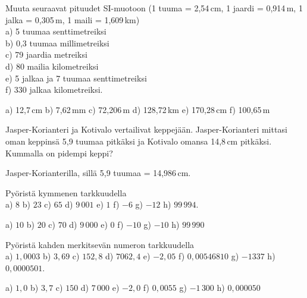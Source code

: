 \begin{tehtavasivu}
\begin{tehtava}
Muuta seuraavat pituudet SI-muotoon (1 tuuma = 2,54\,cm, 1 jaardi = 0,914\,m, 1 jalka = 0,305\,m, 1 maili = 1,609\,km) \\
a) 5 tuumaa senttimetreiksi \\
b) 0,3 tuumaa millimetreiksi \\
c) 79 jaardia metreiksi \\
d) 80 mailia kilometreiksi \\
e) 5 jalkaa ja 7 tuumaa senttimetreiksi \\
f) 330 jalkaa kilometreiksi.
\begin{vastaus}
a) 12,7\,cm \qquad
b) 7,62\,mm \qquad
c) 72,206\,m \qquad
d) 128,72\,km \qquad
e) 170,28\,cm \qquad
f) 100,65\,m
\end{vastaus}
\end{tehtava}

\begin{tehtava}
Jasper-Korianteri ja Kotivalo vertailivat keppejään. Jasper-Korianteri mittasi oman keppinsä 5,9 tuumaa pitkäksi ja Kotivalo omansa 14,8\,cm pitkäksi. Kummalla on pidempi keppi?
\begin{vastaus}
Jasper-Korianterilla, sillä 5,9 tuumaa = 14,986\,cm.
\end{vastaus}
\end{tehtava}

\begin{tehtava}
Pyöristä kymmenen tarkkuudella \\
a) $8$ \qquad
b) $23$ \qquad
c) $65$ \qquad
d) $9\,001$ \qquad
e) $1$ \qquad
f) $-6$ \qquad
g) $-12$ \qquad
h) $99\,994$.
\begin{vastaus}
a) $10$ \qquad
b) $20$ \qquad
c) $70$ \qquad
d) $9\,000$ \qquad
e) $0$ \qquad
f) $-10$ \qquad
g) $-10$ \qquad
h) $99\,990$
\end{vastaus}
\end{tehtava}

\begin{tehtava}
Pyöristä kahden merkitsevän numeron tarkkuudella \\
a) $1,0003$ \qquad
b) $3,69$ \qquad
c) $152,8$ \qquad
d) $7062,4$ \qquad
e) $-2,05$ \qquad
f) $0,00546810$ \qquad
g) $-1337$ \qquad
h) $0,0000501$.
\begin{vastaus}
a) $1,0$ \qquad
b) $3,7$ \qquad
c) $150$ \qquad
d) $7\,000$ \qquad
e) $-2,0$ \qquad
f) $0,0055$ \qquad
g) $-1\,300$ \qquad
h) $0,000050$
\end{vastaus}
\end{tehtava}


\end{tehtavasivu}
